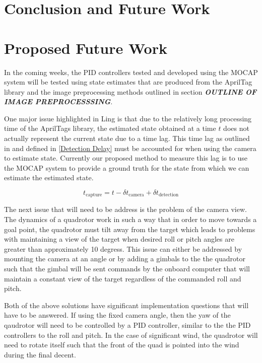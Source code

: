 \documentclass[11pt, twocolumn]{article}
\begin{document}
\section{Conclusion and Future Work}


\section{Proposed Future Work}
In the coming weeks, the PID controllers tested and developed using the MOCAP system will be tested using state estimates that are produced from the AprilTag library and the image preprocessing methods outlined in section \textbf{\textit{OUTLINE OF IMAGE PREPROCESSSING}}. 

One major issue highlighted in Ling \cite{Ling2014} is that due to the relatively long processing time of the AprilTags library, the estimated state obtained at a time $t$ does not actually represent the current state due to a time lag. This time lag as outlined in \cite{Ling2014} and defined in \ref{Detection Delay} must be accounted for when using the camera to estimate state. Currently our proposed method to measure this lag is to use the MOCAP system to provide a ground truth for the state from which we can estimate the estimated state.  

\begin{equation}
\label{Detection Delay}
    t_{\text{capture}} = t - \delta t_{\text{camera}} + \delta t_{\text{detection}}
\end{equation}

The next issue that will need to be address is the problem of the camera view. The dynamics of a quadrotor work in such a way that in order to move towards a goal point, the quadrotor must tilt away from the target which leads to problems with maintaining a view of the target when desired roll or pitch angles are greater than approximately 10 degress. This issue can either be addressed by mounting the camera at an angle or by adding a gimbals to the the quadrotor such that the gimbal will be sent commands by the onboard computer that will maintain a constant view of the target regardless of the commanded roll and pitch. 

Both of the above solutions have significant implementation questions that will have to be answered. If using the fixed camera angle, then the yaw of the qaudrotor will need to be controlled by a PID controller, similar to the the PID controllers to the roll and pitch. In the case of significant wind, the quadrotor will need to rotate itself such that the front of the quad is pointed into the wind during the final decent.
\end{document}
